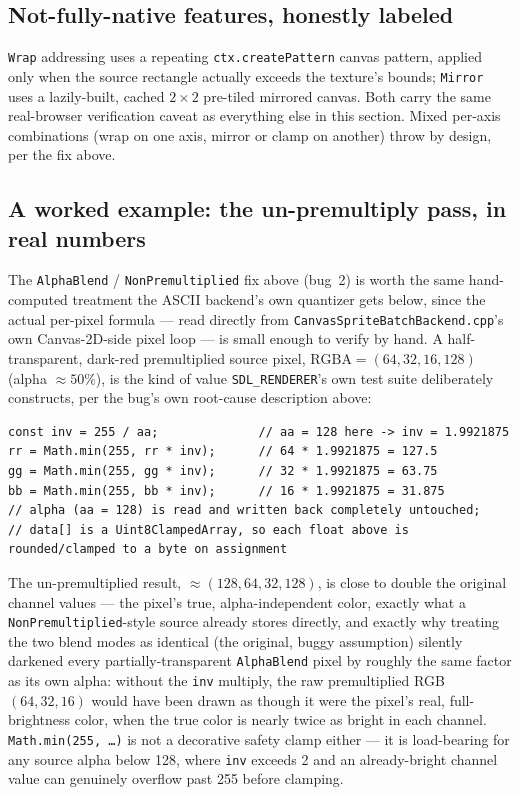 \subsection{Not-fully-native features, honestly labeled}

\texttt{Wrap} addressing uses a repeating \texttt{ctx.createPattern} canvas pattern, applied
only when the source rectangle actually exceeds the texture's bounds;
\texttt{Mirror} uses a lazily-built, cached $2\times2$ pre-tiled mirrored canvas. Both carry
the same real-browser verification caveat as everything else in this section. Mixed per-axis
combinations (wrap on one axis, mirror or clamp on another) throw by design, per the fix
above.

\subsection{A worked example: the un-premultiply pass, in real numbers}

The \texttt{AlphaBlend} / \texttt{NonPremultiplied} fix above (bug~2) is worth the same
hand-computed treatment the ASCII backend's own quantizer gets below, since the actual
per-pixel formula --- read directly from \texttt{CanvasSpriteBatchBackend.cpp}'s own
Canvas-2D-side pixel loop --- is small enough to verify by hand. A half-transparent, dark-red
premultiplied source pixel, $\text{RGBA} = (64, 32, 16, 128)$ (alpha $\approx 50\%$), is the
kind of value \texttt{SDL\_RENDERER}'s own test suite deliberately constructs, per the bug's
own root-cause description above:

\begin{lstlisting}
const inv = 255 / aa;              // aa = 128 here -> inv = 1.9921875
rr = Math.min(255, rr * inv);      // 64 * 1.9921875 = 127.5
gg = Math.min(255, gg * inv);      // 32 * 1.9921875 = 63.75
bb = Math.min(255, bb * inv);      // 16 * 1.9921875 = 31.875
// alpha (aa = 128) is read and written back completely untouched;
// data[] is a Uint8ClampedArray, so each float above is rounded/clamped to a byte on assignment
\end{lstlisting}

The un-premultiplied result, $\approx(128, 64, 32, 128)$, is close to double the original
channel values --- the pixel's true, alpha-independent color, exactly what a
\texttt{NonPremultiplied}-style source already stores directly, and exactly
why treating the two blend modes as identical (the original, buggy assumption) silently
darkened every partially-transparent \texttt{AlphaBlend} pixel by roughly the same factor as
its own alpha: without the \texttt{inv} multiply, the raw premultiplied RGB $(64,32,16)$ would
have been drawn as though it were the pixel's real, full-brightness color, when the true color
is nearly twice as bright in each channel. \texttt{Math.min(255, \ldots{})} is not a decorative
safety clamp either --- it is load-bearing for any source alpha below 128, where
\texttt{inv} exceeds 2 and an already-bright channel value can genuinely overflow past 255
before clamping.

